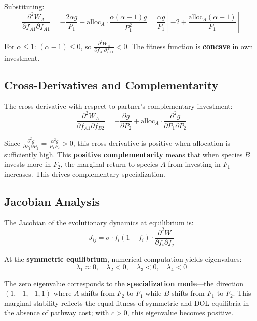 \documentclass[11pt]{article}
\theoremstyle{definition}
\newcommand{\pd}[2]{\frac{\partial #1}{\partial #2}}
\newcommand{\pdd}[3]{\frac{\partial^2 #1}{\partial #2 \partial #3}}
\begin{document}
Substituting:
\begin{equation}
\pdd{W_A}{f_{A1}}{f_{A1}} = -\frac{2\alpha g}{P_1} + \text{alloc}_A \cdot \frac{\alpha(\alpha-1)g}{P_1^2} = \frac{\alpha g}{P_1}\left[-2 + \frac{\text{alloc}_A(\alpha-1)}{P_1}\right]
\label{eq:d2W_final}
\end{equation}

For $\alpha \leq 1$: $(\alpha - 1) \leq 0$, so $\pdd{W_A}{f_{A1}}{f_{A1}} < 0$. The fitness function is \textbf{concave} in own investment.

\subsection{Cross-Derivatives and Complementarity}

The cross-derivative with respect to partner's complementary investment:
\begin{equation}
\pdd{W_A}{f_{A1}}{f_{B2}} = -\pd{g}{P_2} + \text{alloc}_A \cdot \pdd{g}{P_1}{P_2}
\label{eq:cross}
\end{equation}

Since $\pdd{g}{P_1}{P_2} = \frac{\alpha^2 g}{P_1 P_2} > 0$, this cross-derivative is positive when allocation is sufficiently high. This \textbf{positive complementarity} means that when species $B$ invests more in $F_2$, the marginal return to species $A$ from investing in $F_1$ increases. This drives complementary specialization.

\subsection{Jacobian Analysis}

The Jacobian of the evolutionary dynamics at equilibrium is:
\begin{equation}
J_{ij} = \sigma \cdot f_i(1-f_i) \cdot \pdd{W}{f_i}{f_j}
\label{eq:jacobian}
\end{equation}

At the \textbf{symmetric equilibrium}, numerical computation yields eigenvalues:
\begin{equation}
\lambda_1 \approx 0, \quad \lambda_2 < 0, \quad \lambda_3 < 0, \quad \lambda_4 < 0
\end{equation}

The zero eigenvalue corresponds to the \textbf{specialization mode}---the direction $(1, -1, -1, 1)$ where $A$ shifts from $F_2$ to $F_1$ while $B$ shifts from $F_1$ to $F_2$. This marginal stability reflects the equal fitness of symmetric and DOL equilibria in the absence of pathway cost; with $c > 0$, this eigenvalue becomes positive.
\end{document}
